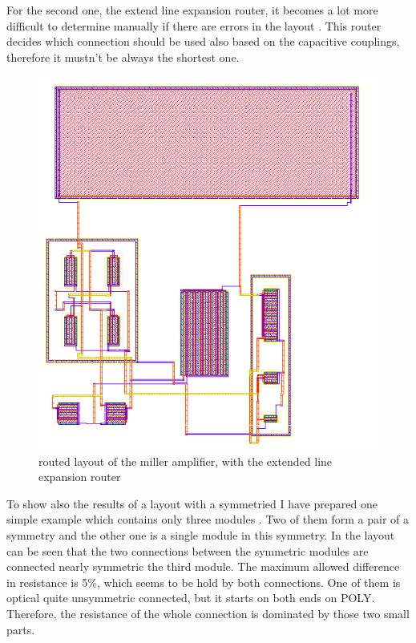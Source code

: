 For the second one, the extend line expansion router, it becomes a lot more difficult to determine manually if there are errors in the layout . This router decides which connection should be used also based on the capacitive couplings, therefore it mustn't be always the shortest one.

\begin{figure}
	\centering
	\includegraphics[scale=.6]{FIG/miller_amplifier_routed_extended_line_expansion.png}
  	\caption{routed layout of the miller amplifier, with the extended line expansion router}
	\label{fig:miller_amplifier_routed_extended_line_expansion}
\end{figure}

To show also the results of a layout with a symmetried I have prepared one simple example which contains only three modules . Two of them form a pair of a symmetry and the other one is a single module in this symmetry. In the layout can be seen that the two connections between the symmetric modules are connected nearly symmetric the third module. The maximum allowed difference in resistance is 5\%, which seems to be hold by both connections. One of them is optical quite unsymmetric connected, but it starts on both ends on POLY. Therefore, the resistance of the whole connection is dominated by those two small parts.

